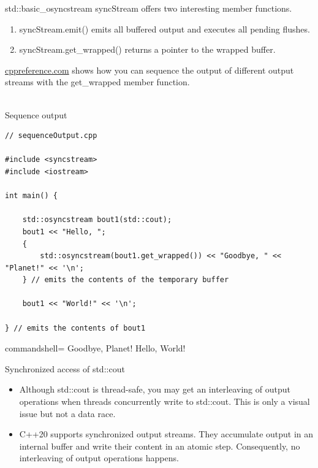 std::basic\_osyncstream syncStream offers two interesting member functions.

\begin{enumerate}
\item 
syncStream.emit() emits all buffered output and executes all pending flushes.

\item 
syncStream.get\_wrapped() returns a pointer to the wrapped buffer.
\end{enumerate}

\href{https://en.cppreference.com/w/cpp/io/basic_osyncstream/get_wrapped}{cppreference.com} shows how you can sequence the output of different output streams with the get\_wrapped member function.

\hspace*{\fill} \\ %
\noindent
Sequence output
\begin{lstlisting}[style=styleCXX]
// sequenceOutput.cpp

#include <syncstream>
#include <iostream>

int main() {
	
	std::osyncstream bout1(std::cout);
	bout1 << "Hello, ";
	{
		std::osyncstream(bout1.get_wrapped()) << "Goodbye, " << "Planet!" << '\n';
	} // emits the contents of the temporary buffer

	bout1 << "World!" << '\n';
	
} // emits the contents of bout1
\end{lstlisting}

\begin{tcblisting}{commandshell={}}
Goodbye, Planet!
Hello, World!
\end{tcblisting}

\begin{center}
Synchronized access of std::cout
\end{center}

\begin{tcolorbox}[breakable,enhanced jigsaw,colback=mygreen!5!white,colframe=mygreen!75!black,title={Distilled Information}]
	
\begin{itemize}
\item 
Although std::cout is thread-safe, you may get an interleaving of output operations when threads concurrently write to std::cout. This is only a visual issue but not a data race.

\item 
C++20 supports synchronized output streams. They accumulate output in an internal buffer and write their content in an atomic step. Consequently, no interleaving of output operations happens.
\end{itemize}
	
\end{tcolorbox}



